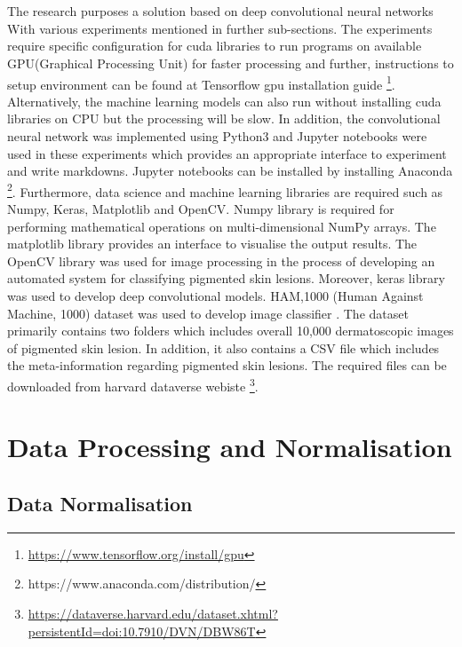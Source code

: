 \section*{}
The research purposes a solution based on deep convolutional neural networks
With various experiments mentioned in further sub-sections.  The experiments
require specific configuration for cuda libraries to run programs on available GPU(Graphical Processing Unit) for faster processing
and further, instructions to setup environment can be found at Tensorflow gpu installation guide \footnote[1]{\url{https://www.tensorflow.org/install/gpu}}.
Alternatively, the machine learning models can also run without installing cuda libraries on CPU but the processing will be slow.
In addition, the convolutional neural network was implemented using Python3 and Jupyter notebooks were used in these experiments which provides an appropriate interface to experiment and write markdowns.  
Jupyter notebooks can be installed by installing Anaconda \footnote[2]{https://www.anaconda.com/distribution/}.
Furthermore, data science and machine learning libraries are required such as Numpy, Keras, Matplotlib and OpenCV. 
Numpy library is required for performing mathematical operations on multi-dimensional NumPy arrays. The matplotlib library provides an interface to visualise the output results. 
The OpenCV library was used for image processing in the process of developing an automated system for classifying
pigmented skin lesions. Moreover, keras library was used to develop deep convolutional models. 
HAM,1000 (Human Against Machine, 1000) dataset was used to develop image classifier \citep{DVN/DBW86T_2018}.
The dataset primarily contains two folders which includes overall 10,000 dermatoscopic images of pigmented skin lesion. In addition, it also contains a CSV file which includes the meta-information regarding pigmented skin lesions.
The required files can be downloaded from harvard dataverse webiste \footnote[3]{\url{https://dataverse.harvard.edu/dataset.xhtml?persistentId=doi:10.7910/DVN/DBW86T}}.

\pagebreak
\section{Data Processing and Normalisation}

\subsection{Data Normalisation}

\pagebreak
